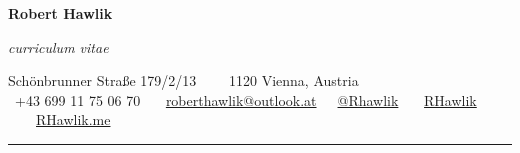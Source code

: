\documentclass[11pt, a4paper]{article}
\begin{document}
\begin{center}
{\LARGE \textbf{Robert Hawlik}}

\emph{curriculum vitae}
\vspace{6pt}

Schönbrunner Straße 179/2/13\ \ \textbullet
\ \ 1120 Vienna, Austria
\\
\faMobile \ +43 699 11 75 06 70 \ \ \faPaperPlane \ \href{mailto:roberthawlik@outlook.at}{roberthawlik@outlook.at}\ \ \faTwitter \ \href{https://twitter.com/RHawlik}{@Rhawlik} \ \ \faLinkedin \ \href{https://www.linkedin.com/in/rhawlik}{RHawlik}
\ \ \faGlobe \ \ \href{https://rhawlik.me}{RHawlik.me}
\vspace{-5pt}
\end{center}

\hrule
\vspace{0em}

%
\end{document}
